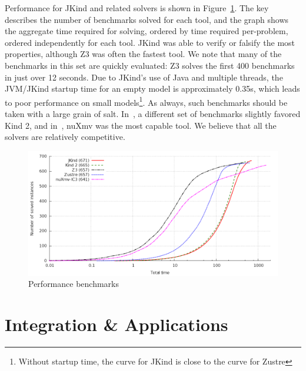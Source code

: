 \documentclass{llncs}
\newcommand{\jkind}{{\sc JKind}\xspace}
\newcommand{\kind}{{\sc Kind}\xspace}
\newcommand{\nuxmv}{{\sc nuXmv}\xspace}
\newcommand{\zustre}{{\sc Zustre}\xspace}
\newcommand{\zthree}{{\sc Z3}\xspace}
\newcommand{\mike}[1]{\textcolor{red}{#1}}
\begin{document}
Performance for \jkind and related solvers is shown in
Figure~\ref{fig:benchmark}. The key describes the number of benchmarks
solved for each tool, and the graph shows the aggregate time required
for solving, ordered by time required per-problem, ordered
independently for each tool. \jkind was able to verify or falsify the
most properties, although \zthree was often the fastest tool.  We note
that many of the benchmarks in this set are quickly evaluated: \zthree
solves the first 400 benchmarks in just over 12 seconds.  Due to \jkind's use of
Java and multiple threads, the JVM/\jkind startup time for an empty
model is approximately 0.35s, which leads to poor performance on small
models\footnote{Without startup time, the curve for \jkind is close to
  the curve for \zustre}.  As always, such benchmarks should be taken with
a large grain of salt.  In~\cite{champion2016cav}, a different set of
benchmarks slightly favored \kind2, and in~\cite{cimatti2014tacas}, \nuxmv was the most capable tool.  We believe that all the solvers are relatively competitive.


\begin{figure}
  \begin{center}
    \includegraphics[width=\textwidth]{graph.png}
  \end{center}
  \vspace{-2em}
  \caption{Performance benchmarks}
  \vspace{-1em}
  \label{fig:benchmark}
\end{figure}


\section{Integration \& Applications}

\end{document}
